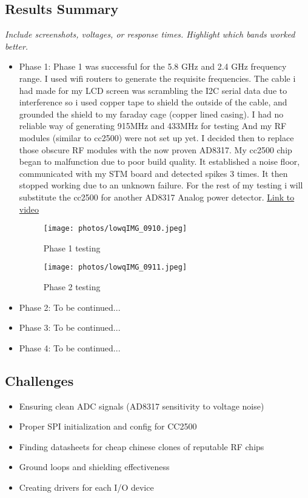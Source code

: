 \documentclass[12pt]{article}
\begin{document}
\subsection{Results Summary}
\textit{Include screenshots, voltages, or response times. Highlight which bands worked better.}
\begin{itemize}
    \item Phase 1: Phase 1 was successful for the 5.8 GHz and 2.4 GHz frequency range. I used wifi routers to generate the requisite frequencies. The cable i had made for my LCD screen was scrambling the I2C serial data due to interference so i used copper tape to shield the outside of the cable, and grounded the shield to my faraday cage (copper lined casing). I had no reliable way of generating 915MHz and 433MHz for testing And my RF modules (similar to cc2500) were not set up yet. I decided then to replace those obscure RF modules with the now proven AD8317. My cc2500 chip began to malfunction due to poor build quality. It established a noise floor, communicated with my STM board and detected spikes 3 times. It then stopped working due to an unknown failure. For the rest of my testing i will substitute the cc2500 for another AD8317 Analog power detector. 
    \href{https://youtu.be/zc-Dw4LfCuc}{Link to video}
    \begin{figure}[H]
    \centering
    \texttt{[image: photos/lowqIMG\_0910.jpeg]}
    \caption{Phase 1 testing}
    \end{figure}
    \begin{figure}[H]
    \centering
    \texttt{[image: photos/lowqIMG\_0911.jpeg]}
    \caption{Phase 2 testing}
    \end{figure}
    
    \item Phase 2: To be continued...
    \item Phase 3: To be continued...
    \item Phase 4: To be continued...
\end{itemize}

\subsection{Challenges}
\begin{itemize}
    \item Ensuring clean ADC signals (AD8317 sensitivity to voltage noise)
    \item Proper SPI initialization and config for CC2500
    \item Finding datasheets for cheap chinese clones of reputable RF chips
    \item Ground loops and shielding effectiveness
    \item Creating drivers for each I/O device
\end{itemize}
\end{document}
